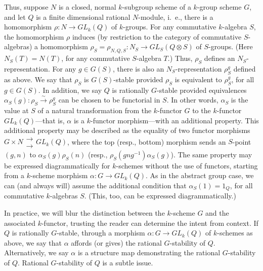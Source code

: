 \documentclass[11pt,leqno,amscd,amssymb,verbatim, url]{amsart}
\theoremstyle{definition}
\numberwithin{equation}{thm}
\begin{document}
      Thus, suppose $N$ is a closed, normal $k$-subgroup scheme of a $k$-group scheme $G$, and let $Q$ is a finite dimensional rational $N$-module, i.~e., there is a homomorphism $\rho:N\to GL_k(Q)$ of $k$-groups. For any commutative $k$-algebra $S$, the homomorphism $\rho$ induces (by restriction to the category of commutative $S$-algebras) a homomorphism $\rho_S=\rho_{N,Q,S}:N_S\to GL_S(Q\otimes S)$ of $S$-groups. (Here $N_S(T)=N(T)$, for any commutative $S$-algebra $T$.) Thus, $\rho_S$ defines an $N_S$-representation.
For any $g\in G(S)$, there is also an $N_S$-representation $\rho^g_S$ defined as above.
We say that $\rho_S$ is $G(S)$-stable provided
$\rho_S$ is equivalent to $\rho_S^g$, for all $g\in G(S)$. In addition, we say $Q$ is rationally $G$-stable provided
equivalences $\alpha_S(g):\rho_S\overset\sim\to \rho_S^g$ can be chosen to be functorial in $S$.
In other words, $\alpha_S$ is the value at $S$ of a natural transformation from the $k$-functor $G$ to the $k$-functor $GL_k(Q)$---that
 is, $\alpha$ is a $k$-functor morphism---with an additional property. This additional property may be described as the equality of two
 functor morphisms $G\times N\begin{smallmatrix} \to\\ \to\end{smallmatrix} GL_k(Q)$, where the top (resp., bottom)
morphism sends an $S$-point $(g,n)$ to $\alpha_S(g)\rho_S(n)$ (resp., $\rho_S(gng^{-1})\alpha_S(g)$).  The
same property may be expressed diagrammatically for $k$-schemes without the use of functors, starting from a $k$-scheme
morphism $\alpha:G\to GL_k(Q)$. As in the abstract group case, we can (and always will) assume the additional condition that $\alpha_S(1)=1_{Q}$, for all commutative $k$-algebras $S$. (This, too, can
be expressed diagrammatically.)


In practice, we will blur the distinction between the $k$-scheme $G$ and the associated $k$-functor, trusting the reader can
determine the intent from context.  If $Q$ is rationally $G$-stable, through a morphism $\alpha:G\to GL_k(Q)$ of $k$-schemes as above, we say that $\alpha$ affords (or gives) the rational $G$-stability of $Q$. Alternatively, we
say $\alpha$  is a structure map demonstrating the rational $G$-stability of $Q$. Rational $G$-stability of $Q$ is a subtle issue.
\end{document}
